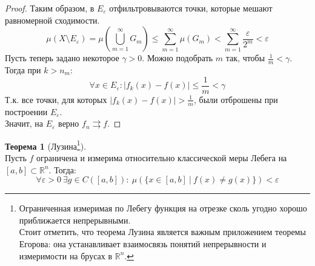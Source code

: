 \documentclass[11pt,a4paper]{report}
\def\eps{\varepsilon}
\def\Real{\mathbb{R}}
\theoremstyle{definition}
\theoremstyle{definition}
\newtheorem{theorem}{Теорема}[section]
\theoremstyle{definition}
\begin{document}
\begin{proof}
		Таким образом, в $ E_{\eps} $ отфильтровываются точки, которые мешают равномерной сходимости.\\
		\[ \mu(X \setminus E_{\eps}) = \mu\left (\bigcup\limits_{m=1}^{\infty}G_{m}\right ) \le \sum\limits_{m=1}^{\infty}\mu(G_{m}) < \sum\limits_{m=1}^{\infty}\frac{\eps}{2^{m}} < \eps \]
		Пусть теперь задано некоторое $ \gamma > 0 $. Можно подобрать $ m $ так, чтобы $ \frac{1}{m} < \gamma $.\\
		Тогда при $ k > n_{m} $:
		\[ \forall x \in E_{\eps}: |f_{k}(x) - f(x)| \le \frac{1}{m} < \gamma \]
		Т.к. все точки, для которых $ |f_{k}(x) - f(x)| > \frac{1}{m} $, были отброшены при построении $ E_{\eps} $.\\
		Значит, на $ E_{\eps} $ верно $ f_{n} \rightrightarrows f $.
	\end{proof}
	\begin{theorem}[Лузина\footnote{Ограниченная измеримая по Лебегу функция  на отрезке сколь угодно хорошо приближается непрерывными.\\ Стоит отметить, что теорема Лузина является важным приложением теоремы Егорова: она устанавливает взаимосвязь понятий непрерывности и измеримости на брусах в $ \Real^{n} $.}]$  $\\
		Пусть $ f $ ограничена и измерима относительно классической меры Лебега на $ [a, b] \subset \Real^{n} $. 
		Тогда:
		\[ \forall \eps > 0\ \exists g \in C([a, b]):\ \mu(\{x \in [a, b]\ |\ f(x) \neq g(x) \}) < \eps \]
	\end{theorem}
\end{document}
